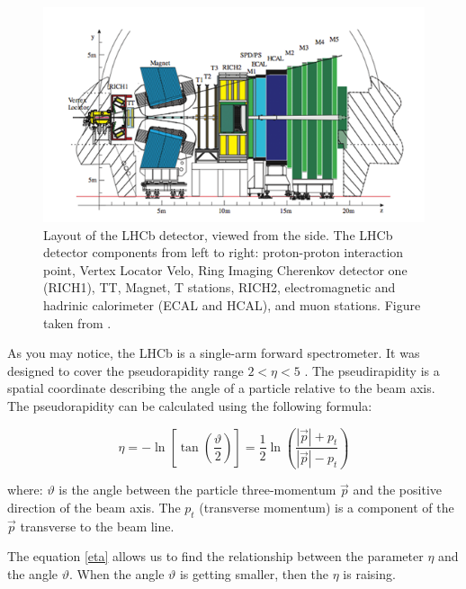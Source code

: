 \begin{figure}
\includegraphics[width=\textwidth]{figures/lhcblayout.png}
\caption{Layout of the LHCb detector, viewed from the side. The LHCb detector components from left to right: proton-proton interaction point, Vertex Locator Velo, Ring Imaging Cherenkov detector one (RICH1), TT, Magnet, T stations, RICH2, electromagnetic and hadrinic calorimeter (ECAL and HCAL), and muon stations. Figure taken from \cite{lhcb_layout}. 
\label{fig:LHCBlayout}}
\end{figure}


As you may notice, the LHCb is a single-arm forward spectrometer. It was designed to cover the pseudorapidity range $2< \eta < 5 $  \cite{LHCb_TDR}. The pseudirapidity is a spatial coordinate describing the angle of a particle relative to the beam axis. The  pseudorapidity can be calculated using the following formula: 

\begin{equation}
    \eta = - \ln\left[ \tan \left( \frac{\vartheta }{2}\right) \right]\nonumber = \frac{1}{2} \ln \left( \frac{|\vec{p}|+ p_t}{|\vec{p}|- p_t}  \right)
    \label{eta}
\end{equation}

where: $\vartheta$  is the angle between the particle three-momentum $\vec{p}$ and the positive direction of the beam axis. The $p_t$ (transverse momentum) is a component of the $\vec{p}$ transverse to the beam line.

The equation \ref{eta} allows us to find the relationship between the parameter $\eta$ and the angle $\vartheta$. When the angle $\vartheta$ is getting smaller, then the $\eta$ is raising.    


